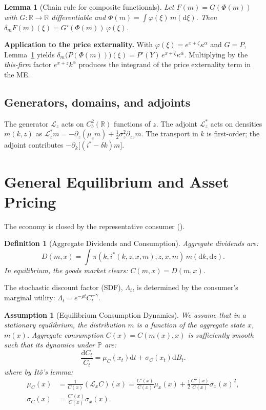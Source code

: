 \documentclass[11pt,letterpaper,oneside]{article}
\newtheorem{lemmaT}{Lemma}
\newtheorem{assumptionT}{Assumption}
\newtheorem{definitionT}{Definition}
\newenvironment{assumption}[2]{\begin{assumptionT}[#1]\label{ass:#2}}{\end{assumptionT}}
\newenvironment{definition}[2]{\begin{definitionT}[#1]\label{def:#2}}{\end{definitionT}}
\newenvironment{lemma}[2]{\begin{lemmaT}[#1]\label{lem:#2}}{\end{lemmaT}}
\newcommand{\R}{\mathbb{R}}
\newcommand{\diff}{\mathrm{d}}
\newcommand{\Lx}{\mathcal{L}_x}
\newcommand{\Lz}{\mathcal{L}_z}
\newcommand{\Lzadj}{\mathcal{L}_z^{*}}
\newcommand{\Dm}{\delta_m}
\newcommand{\extbf}[1]{\textbf{#1}}
\begin{document}
\begin{lemma}{Chain rule for composite functionals}{chain}
Let $F(m)=G(\Phi(m))$ with $G:\R\to\R$ differentiable and $\Phi(m)=\int \varphi(\xi)\,m(\diff\xi)$. Then $\Dm F(m)(\xi)=G'(\Phi(m))\,\varphi(\xi)$.
\end{lemma}

\begin{tcolorbox}[mathstyle]
  \extbf{Application to the price externality.} With $\varphi(\xi)=e^{x+\zeta}\kappa^\alpha$ and $G=P$, Lemma~\ref{lem:chain} yields
$\Dm\big(P(\Phi(m))\big)(\xi)=P'(Y)\,e^{x+\zeta}\kappa^\alpha$.
Multiplying by the \emph{this-firm} factor $e^{x+z}k^\alpha$ produces the integrand of the price externality term in the ME.
\end{tcolorbox}

\subsection{Generators, domains, and adjoints}
The generator $\Lz$ acts on $C_b^2(\R)$ functions of $z$. The adjoint $\Lzadj$ acts on densities $m(k,z)$ as $\Lzadj m = -\partial_z(\mu_z m) + \tfrac12 \sigma_z^2 \partial_{zz} m$. The transport in $k$ is first-order; the adjoint contributes $-\partial_k\big[(i^*-\delta k)m\big]$.

\section{General Equilibrium and Asset Pricing}\label{sec:pricing}

The economy is closed by the representative consumer ().

\begin{definition}{Aggregate Dividends and Consumption}{agg_cd}
Aggregate dividends are:
$$
D(m,x) = \int \pi(k,i^*(k,z,x,m),z,x,m)\, m(\diff k,\diff z).
$$
In equilibrium, the goods market clears: $C(m,x)=D(m,x)$.
\end{definition}

The stochastic discount factor (SDF), $\Lambda_t$, is determined by the consumer's marginal utility: $\Lambda_t = e^{-\rho t} C_t^{-\gamma}$.

\begin{assumption}{Equilibrium Consumption Dynamics}{ass:c_dynamics}
We assume that in a stationary equilibrium, the distribution $m$ is a function of the aggregate state $x$, $m(x)$. Aggregate consumption $C(x)=C(m(x),x)$ is sufficiently smooth such that its dynamics under $\mathbb{P}$ are:
$$
\frac{\diff C_t}{C_t} = \mu_C(x_t)\diff t + \sigma_C(x_t)\diff B_t.
$$
where by Itô's lemma:
\begin{align*}
    \mu_C(x) &= \frac{1}{C(x)} (\Lx C)(x) = \frac{C'(x)}{C(x)}\mu_x(x) + \frac{1}{2}\frac{C''(x)}{C(x)}\sigma_x(x)^2, \\
    \sigma_C(x) &= \frac{C'(x)}{C(x)}\sigma_x(x).
\end{align*}
\end{assumption}
\end{document}
